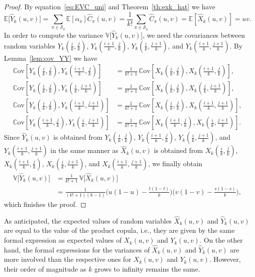 \documentclass[12pt,a4paper]{amsart}
\theoremstyle{definition}
\newcommand{\SK}{\mathcal{S}_k}
\newcommand{\Chat}{\widehat{C}}
\newcommand{\Xhat}{\widehat{X}}
\newcommand{\Yhat}{\widehat{Y}}
\newcommand{\EE}{\mathbb{E}}
\newcommand{\VV}{\mathbb{V}}
\newcommand{\Cov}{\mathbb{C}\mathrm{ov}}
\begin{document}
\begin{proof}
By equation~\eqref{eq:EVC_uni} and Theorem~\ref{th:exk_hat} we have
$$\EE\big[\Yhat_k(u,v)\big]= \sum_{\pi \in \SK} \EE[\alpha_{\pi}] \Chat_{\pi}(u,v) = \frac{1}{k!}\sum_{\pi \in \SK} \Chat_{\pi}(u,v) = \EE[\Xhat_k(u,v)]= uv.$$
In order to compute the variance $\VV\big[\Yhat_k(u,v)\big]$, we need the covariances between random variables $Y_k(\tfrac{i}{k},\tfrac{j}{k})$, $Y_k(\tfrac{i+1}{k},\tfrac{j}{k})$, $Y_k(\tfrac{i}{k},\tfrac{j+1}{k})$, and $Y_k(\tfrac{i+1}{k},\tfrac{j+1}{k})$.
By Lemma~\ref{lem:cov_YY} we have
\begin{align*}
    \Cov[Y_k(\tfrac{i}{k},\tfrac{j}{k}), Y_k(\tfrac{i+1}{k},\tfrac{j}{k})] &= \frac{1}{k!+1}\, \Cov[X_k(\tfrac{i}{k},\tfrac{j}{k}), X_k(\tfrac{i+1}{k},\tfrac{j}{k})], \\
    \Cov[Y_k(\tfrac{i}{k},\tfrac{j}{k}), Y_k(\tfrac{i}{k},\tfrac{j+1}{k})] &= \frac{1}{k!+1}\, \Cov[X_k(\tfrac{i}{k},\tfrac{j}{k}), X_k(\tfrac{i}{k},\tfrac{j+1}{k})], \\
    \Cov[Y_k(\tfrac{i}{k},\tfrac{j}{k}), Y_k(\tfrac{i+1}{k},\tfrac{j+1}{k})] &= \frac{1}{k!+1}\, \Cov[X_k(\tfrac{i}{k},\tfrac{j}{k}), X_k(\tfrac{i+1}{k},\tfrac{j+1}{k})], \\
    \Cov[Y_k(\tfrac{i+1}{k},\tfrac{j}{k}), Y_k(\tfrac{i}{k},\tfrac{j+1}{k})] &= \frac{1}{k!+1}\, \Cov[X_k(\tfrac{i+1}{k},\tfrac{j}{k}), X_k(\tfrac{i}{k},\tfrac{j+1}{k})]. 
\end{align*}
Since $\Yhat_k(u,v)$ is obtained from $Y_k(\tfrac{i}{k},\tfrac{j}{k})$, $Y_k(\tfrac{i+1}{k},\tfrac{j}{k})$, $Y_k(\tfrac{i}{k},\tfrac{j+1}{k})$, and $Y_k(\tfrac{i+1}{k},\tfrac{j+1}{k})$ in the same manner as $\Xhat_k(u,v)$ is obtained from $X_k(\tfrac{i}{k},\tfrac{j}{k})$, $X_k(\tfrac{i+1}{k},\tfrac{j}{k})$, $X_k(\tfrac{i}{k},\tfrac{j+1}{k})$, and $X_k(\tfrac{i+1}{k},\tfrac{j+1}{k})$, we finally obtain
\begin{align*}
    \VV\big[\Yhat_k(u,v)\big] &= \frac{1}{k!+1}\, \VV\big[\Xhat_k(u,v)\big] \\
    &= \frac{1}{(k!+1)(k-1)}\Big(u(1-u)-\frac{t(1-t)}{k}\Big)\Big(v(1-v)-\frac{s(1-s)}{k}\Big),
\end{align*}
which finishes the proof.
\end{proof}

As anticipated, the expected values of random variables $\Xhat_k(u,v)$ and $\Yhat_k(u,v)$ are equal to the value of the product copula, i.e., they are given by the same formal expression as expected values of $X_k(u,v)$ and $Y_k(u,v)$. On the other hand, the formal expressions for the variances of  $\Xhat_k(u,v)$ and $\Yhat_k(u,v)$ are more involved than the respective ones for $X_k(u,v)$ and $Y_k(u,v)$. However, their order of magnitude as $k$ grows to infinity remains the same.
\end{document}
